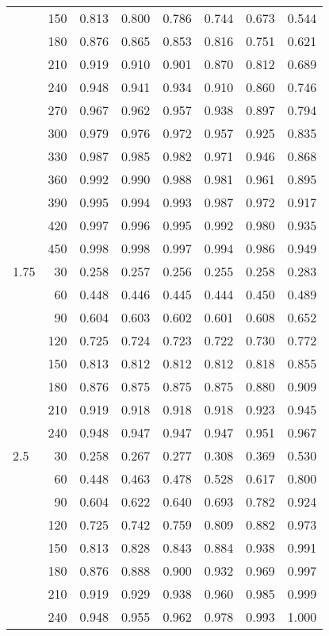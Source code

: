 \documentclass[bimj,fleqn]{w-art}\usepackage[]{graphicx}\usepackage[]{color}
\theoremstyle{plain}
\theoremstyle{definition}
\begin{document}
\begin{table}[ht]
\begin{tabular}{lrrrrrrr}
   & 150 & 0.813 & 0.800 & 0.786 & 0.744 & 0.673 & 0.544 \\ 
   & 180 & 0.876 & 0.865 & 0.853 & 0.816 & 0.751 & 0.621 \\ 
   & 210 & 0.919 & 0.910 & 0.901 & 0.870 & 0.812 & 0.689 \\ 
   & 240 & 0.948 & 0.941 & 0.934 & 0.910 & 0.860 & 0.746 \\ 
   & 270 & 0.967 & 0.962 & 0.957 & 0.938 & 0.897 & 0.794 \\ 
   & 300 & 0.979 & 0.976 & 0.972 & 0.957 & 0.925 & 0.835 \\ 
   & 330 & 0.987 & 0.985 & 0.982 & 0.971 & 0.946 & 0.868 \\ 
   & 360 & 0.992 & 0.990 & 0.988 & 0.981 & 0.961 & 0.895 \\ 
   & 390 & 0.995 & 0.994 & 0.993 & 0.987 & 0.972 & 0.917 \\ 
   & 420 & 0.997 & 0.996 & 0.995 & 0.992 & 0.980 & 0.935 \\ 
   & 450 & 0.998 & 0.998 & 0.997 & 0.994 & 0.986 & 0.949 \\ 
  1.75 & 30 & 0.258 & 0.257 & 0.256 & 0.255 & 0.258 & 0.283 \\ 
   & 60 & 0.448 & 0.446 & 0.445 & 0.444 & 0.450 & 0.489 \\ 
   & 90 & 0.604 & 0.603 & 0.602 & 0.601 & 0.608 & 0.652 \\ 
   & 120 & 0.725 & 0.724 & 0.723 & 0.722 & 0.730 & 0.772 \\ 
   & 150 & 0.813 & 0.812 & 0.812 & 0.812 & 0.818 & 0.855 \\ 
   & 180 & 0.876 & 0.875 & 0.875 & 0.875 & 0.880 & 0.909 \\ 
   & 210 & 0.919 & 0.918 & 0.918 & 0.918 & 0.923 & 0.945 \\ 
   & 240 & 0.948 & 0.947 & 0.947 & 0.947 & 0.951 & 0.967 \\ 
  2.5 & 30 & 0.258 & 0.267 & 0.277 & 0.308 & 0.369 & 0.530 \\ 
   & 60 & 0.448 & 0.463 & 0.478 & 0.528 & 0.617 & 0.800 \\ 
   & 90 & 0.604 & 0.622 & 0.640 & 0.693 & 0.782 & 0.924 \\ 
   & 120 & 0.725 & 0.742 & 0.759 & 0.809 & 0.882 & 0.973 \\ 
   & 150 & 0.813 & 0.828 & 0.843 & 0.884 & 0.938 & 0.991 \\ 
   & 180 & 0.876 & 0.888 & 0.900 & 0.932 & 0.969 & 0.997 \\ 
   & 210 & 0.919 & 0.929 & 0.938 & 0.960 & 0.985 & 0.999 \\ 
   & 240 & 0.948 & 0.955 & 0.962 & 0.978 & 0.993 & 1.000 \\ 
   \hline
\end{tabular}
\end{table}
\end{document}
